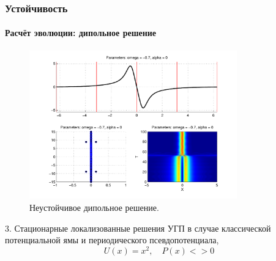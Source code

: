 \documentclass [10pt] {beamer}
\begin{document}
\begin{frame}
	\frametitle{Устойчивость}
	\framesubtitle{Расчёт эволюции: дипольное решение}
	
	\begin{figure}
		\includegraphics[width=0.8\textwidth]{pic/dipole_solution_unstable.pdf}
		\caption{Неустойчивое дипольное решение.}
		\label{pic:dipole_solution_unstable}
	\end{figure}
\end{frame}

\begin{frame}
	\begin{center}
		{\LARGE 3. Стационарные локализованные решения УГП в случае классической потенциальной ямы и периодического псевдопотенциала, $$U(x) = x^2, \quad P(x) <> 0$$}
	\end{center}
\end{frame}
\end{document}
